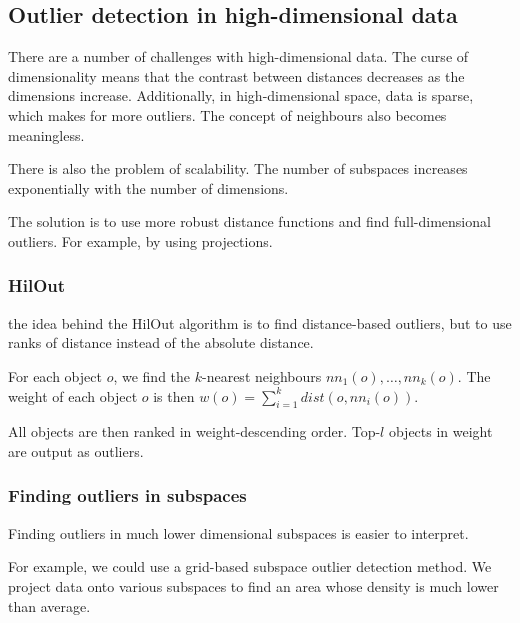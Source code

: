 \subsection{Outlier detection in high-dimensional data}
    There are a number of challenges with high-dimensional data. The curse of dimensionality means that the contrast between distances decreases as the dimensions increase. Additionally, in high-dimensional space, data is sparse, which makes for more outliers. The concept of neighbours also becomes meaningless.
    
    There is also the problem of scalability. The number of subspaces increases exponentially with the number of dimensions. 
    
    The solution is to use more robust distance functions and find full-dimensional outliers. For example, by using projections.
    
\subsubsection{HilOut}
    the idea behind the HilOut algorithm is to find distance-based outliers, but to use ranks of distance instead of the absolute distance. 
    
    For each object $o$, we find the $k$-nearest neighbours $nn_1(o), \dots, nn_k(o)$. The weight of each object $o$ is then $w(o) = \sum_{i=1}^{k}{dist(o, nn_i(o))}$.
    
    All objects are then ranked in weight-descending order. Top-$l$ objects in weight are output as outliers. 
    
\subsubsection{Finding outliers in subspaces}
    Finding outliers in much lower dimensional subspaces is easier to interpret. 
    
    For example, we could use a grid-based subspace outlier detection method. We project data onto various subspaces to find an area whose density is much lower than average. 
    
